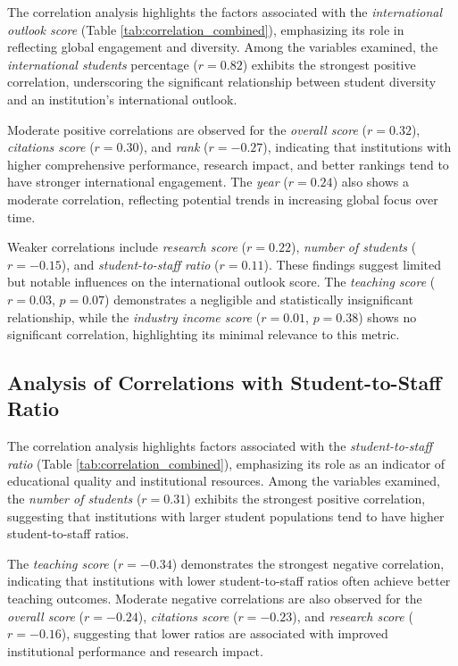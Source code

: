 \documentclass[conference]{IEEEtran}
\begin{document}
The correlation analysis highlights the factors associated with the \textit{international outlook score} (Table \ref{tab:correlation_combined}), emphasizing its role in reflecting global engagement and diversity. Among the variables examined, the \textit{international students} percentage ($r = 0.82$) exhibits the strongest positive correlation, underscoring the significant relationship between student diversity and an institution's international outlook.

Moderate positive correlations are observed for the \textit{overall score} ($r = 0.32$), \textit{citations score} ($r = 0.30$), and \textit{rank} ($r = -0.27$), indicating that institutions with higher comprehensive performance, research impact, and better rankings tend to have stronger international engagement. The \textit{year} ($r = 0.24$) also shows a moderate correlation, reflecting potential trends in increasing global focus over time.

Weaker correlations include \textit{research score} ($r = 0.22$), \textit{number of students} ($r = -0.15$), and \textit{student-to-staff ratio} ($r = 0.11$). These findings suggest limited but notable influences on the international outlook score. The \textit{teaching score} ($r = 0.03$, $p = 0.07$) demonstrates a negligible and statistically insignificant relationship, while the \textit{industry income score} ($r = 0.01$, $p = 0.38$) shows no significant correlation, highlighting its minimal relevance to this metric.


\subsection{Analysis of Correlations with Student-to-Staff Ratio}

The correlation analysis highlights factors associated with the \textit{student-to-staff ratio} (Table \ref{tab:correlation_combined}), emphasizing its role as an indicator of educational quality and institutional resources. Among the variables examined, the \textit{number of students} ($r = 0.31$) exhibits the strongest positive correlation, suggesting that institutions with larger student populations tend to have higher student-to-staff ratios.

The \textit{teaching score} ($r = -0.34$) demonstrates the strongest negative correlation, indicating that institutions with lower student-to-staff ratios often achieve better teaching outcomes. Moderate negative correlations are also observed for the \textit{overall score} ($r = -0.24$), \textit{citations score} ($r = -0.23$), and \textit{research score} ($r = -0.16$), suggesting that lower ratios are associated with improved institutional performance and research impact.
\end{document}
